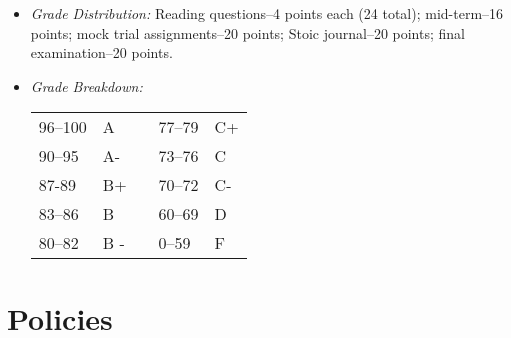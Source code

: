 \documentclass[article,oneside]{memoir}
\begin{document}
\begin{itemize}
\item \textit{Grade Distribution:} Reading questions--4 points each (24 total); mid-term--16 points; mock trial assignments--20 points; Stoic journal--20 points; final examination--20 points.



\item \textit{Grade Breakdown:}

 \begin{tabular}{ | l | l | p{2cm} | l | l | }
    \hline 
96--100 & A  & &  77--79 &  C+ \\  
90--95 & A- & &  73--76 & C \\
87-89 & B+ &  &  70--72 & C- \\ 
83--86 & B  & &  60--69 & D\\
80--82 & B - & & 0--59 & F\\ \hline
    \end{tabular}


\end{itemize}





\section{Policies}
\end{document}
